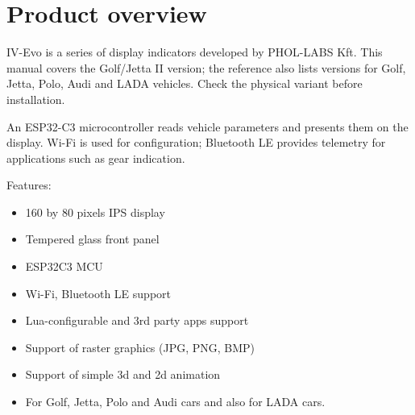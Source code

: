 \chapter{Product overview}
IV-Evo is a series of display indicators developed by PHOL-LABS Kft. This manual covers the Golf/Jetta II version; the reference also lists versions for Golf, Jetta, Polo, Audi and LADA vehicles. Check the physical variant before installation.

An ESP32-C3 microcontroller reads vehicle parameters and presents them on the display. Wi-Fi is used for configuration; Bluetooth LE provides telemetry for applications such as gear indication.

Features:

\begin{itemize}
\item 160 by 80 pixels IPS display
\item Tempered glass front panel
\item ESP32C3 MCU
\item Wi-Fi, Bluetooth LE support
\item Lua-configurable and 3rd party apps support
\item Support of raster graphics (JPG, PNG, BMP)
\item Support of simple 3d and 2d animation
\item For Golf, Jetta, Polo and Audi cars and also for LADA cars.
\end{itemize}
